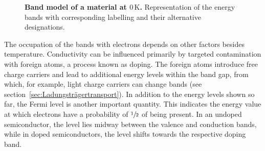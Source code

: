 {%
\begin{figure}[H]
    \renewcommand{\figurename}{Figure}
    \centering
    
    \caption{\textbf{Band model of a material at $0\,\mathrm{K}$.} Representation of the energy bands with corresponding 
    labelling and their alternative designations.}  
    \label{fig:BandermodellEinesMaterialsBei0K}
\end{figure}

%

The occupation of the bands with electrons depends on other factors besides temperature. Conductivity can be influenced primarily by targeted contamination with foreign atoms, a process known as doping.
The foreign atoms introduce free charge carriers and lead to additional energy levels within the band gap, from which, for example, light charge carriers can change bands (see section~\ref{sec:Ladungsträgertransport}). 
In addition to the energy levels shown so far, the Fermi level is another important quantity. 
This indicates the energy value at which electrons have a probability of $\sfrac{1}{2}$ of being present. In an undoped semiconductor, the level lies midway between 
the valence and conduction bands, while in doped semiconductors, the level shifts towards the respective doping band.}


